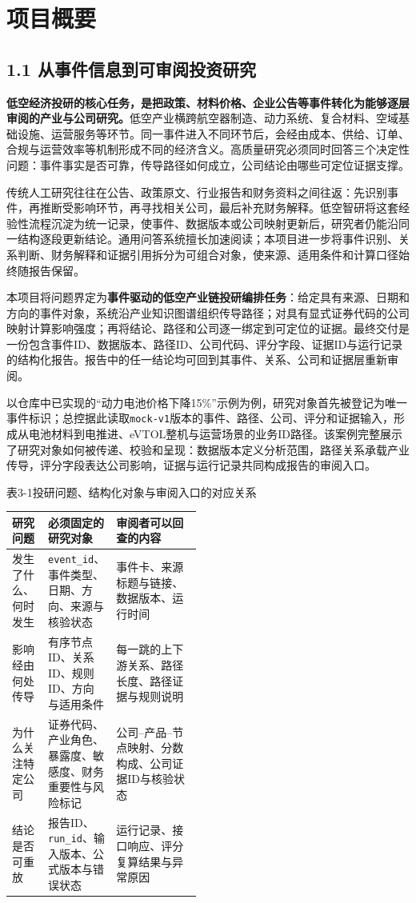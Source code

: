 \clearpage
\section{项目概要}
\subsection*{1.1 从事件信息到可审阅投资研究}\label{page:03}
\noindent\textbf{低空经济投研的核心任务，是把政策、材料价格、企业公告等事件转化为能够逐层审阅的产业与公司研究。}低空产业横跨航空器制造、动力系统、复合材料、空域基础设施、运营服务等环节。同一事件进入不同环节后，会经由成本、供给、订单、合规与运营效率等机制形成不同的经济含义。高质量研究必须同时回答三个决定性问题：事件事实是否可靠，传导路径如何成立，公司结论由哪些可定位证据支撑。

传统人工研究往往在公告、政策原文、行业报告和财务资料之间往返：先识别事件，再推断受影响环节，再寻找相关公司，最后补充财务解释。低空智研将这套经验性流程沉淀为统一记录，使事件、数据版本或公司映射更新后，研究者仍能沿同一结构逐段更新结论。通用问答系统擅长加速阅读；本项目进一步将事件识别、关系判断、财务解释和证据引用拆分为可组合对象，使来源、适用条件和计算口径始终随报告保留。

本项目将问题界定为\textbf{事件驱动的低空产业链投研编排任务}：给定具有来源、日期和方向的事件对象，系统沿产业知识图谱组织传导路径；对具有显式证券代码的公司映射计算影响强度；再将结论、路径和公司逐一绑定到可定位的证据。最终交付是一份包含事件ID、数据版本、路径ID、公司代码、评分字段、证据ID与运行记录的结构化报告。报告中的任一结论均可回到其事件、关系、公司和证据层重新审阅\cite{lhy-architecture,lhy-contracts}。

以仓库中已实现的“动力电池价格下降15\%”示例为例，研究对象首先被登记为唯一事件标识；总控据此读取\texttt{mock-v1}版本的事件、路径、公司、评分和证据输入，形成从电池材料到电推进、eVTOL整机与运营场景的业务ID路径。该案例完整展示了研究对象如何被传递、校验和呈现：数据版本定义分析范围，路径关系承载产业传导，评分字段表达公司影响，证据与运行记录共同构成报告的审阅入口\cite{lhy-repository,lhy-frontend}。

\begin{center}\small 表3-1\quad 投研问题、结构化对象与审阅入口的对应关系\par\vspace{1mm}
\begin{tabularx}{\linewidth}{p{0.19\linewidth}p{0.28\linewidth}X}
\toprule
研究问题 & 必须固定的研究对象 & 审阅者可以回查的内容\\
\midrule
发生了什么、何时发生 & \texttt{event\_id}、事件类型、日期、方向、来源与核验状态 & 事件卡、来源标题与链接、数据版本、运行时间\\
影响经由何处传导 & 有序节点ID、关系ID、规则ID、方向与适用条件 & 每一跳的上下游关系、路径长度、路径证据与规则说明\\
为什么关注特定公司 & 证券代码、产业角色、暴露度、敏感度、财务重要性与风险标记 & 公司--产品--节点映射、分数构成、公司证据ID与核验状态\\
结论是否可重放 & 报告ID、\texttt{run\_id}、输入版本、公式版本与错误状态 & 运行记录、接口响应、评分复算结果与异常原因\\
\bottomrule
\end{tabularx}\end{center}
